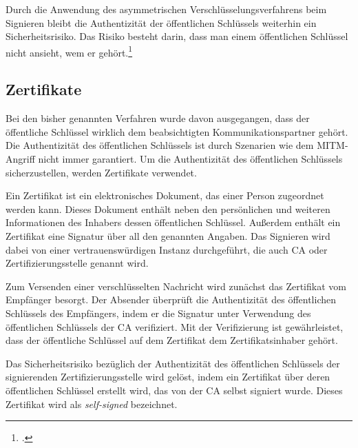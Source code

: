 \documentclass  [paper=a4,
				fontsize=12pt,
				listof=totoc,
				bibliography=totoc
				]{scrreprt}
\begin{document}
				Durch die Anwendung des asymmetrischen Verschlüsselungsverfahrens beim Signieren bleibt die Authentizität der öffentlichen Schlüssels weiterhin ein Sicherheitsrisiko. Das Risiko besteht darin, dass	\glqq man einem öffentlichen Schlüssel nicht ansieht, wem er gehört\grqq{}.\footcite[][S. 506]{Schmeh2013}
	
			\subsection{Zertifikate}\label{chap:zertifikate}
				Bei den bisher genannten Verfahren wurde davon ausgegangen, dass der öffentliche Schlüssel wirklich dem beabsichtigten Kommunikationspartner gehört. Die Authentizität des öffentlichen Schlüssels ist durch Szenarien wie dem \ac{MITM}-Angriff nicht immer garantiert. Um die Authentizität des öffentlichen Schlüssels sicherzustellen, werden Zertifikate verwendet.
				
				Ein Zertifikat ist ein elektronisches Dokument, das einer Person zugeordnet werden kann. Dieses Dokument enthält neben den persönlichen und weiteren Informationen des Inhabers dessen öffentlichen Schlüssel. Außerdem enthält ein Zertifikat eine Signatur über all den genannten Angaben. Das Signieren wird dabei von einer vertrauenswürdigen Instanz durchgeführt, die auch \ac{CA} oder Zertifizierungsstelle genannt wird.
				
				Zum Versenden einer verschlüsselten Nachricht wird zunächst das Zertifikat vom Empfänger besorgt. Der Absender überprüft die Authentizität des öffentlichen Schlüssels des Empfängers, indem er die Signatur unter Verwendung des öffentlichen Schlüssels der \ac{CA} verifiziert. Mit der Verifizierung ist gewährleistet, dass der öffentliche Schlüssel auf dem Zertifikat dem Zertifikatsinhaber gehört.
				
				Das Sicherheitsrisiko bezüglich der Authentizität des öffentlichen Schlüssels der signierenden Zertifizierungsstelle wird gelöst, indem ein Zertifikat über deren öffentlichen Schlüssel erstellt wird, das von der \ac{CA} selbst signiert wurde. Dieses Zertifikat wird als \textit{self-signed} bezeichnet.
	
\end{document}
